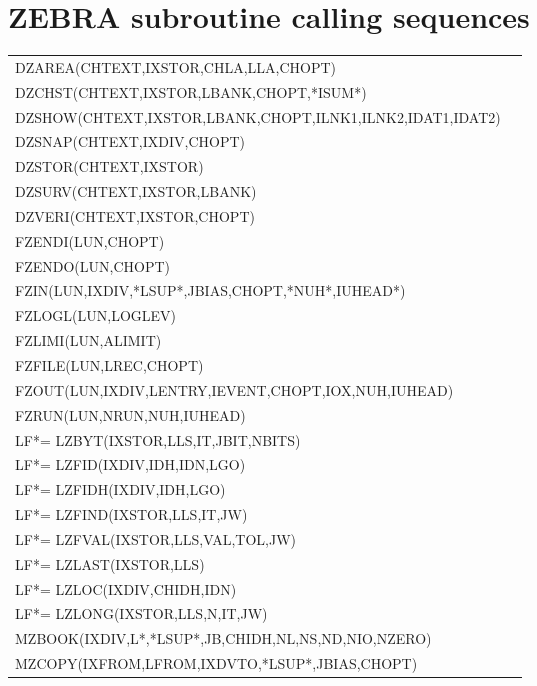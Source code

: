 \section{ZEBRA subroutine calling sequences}
{\tt \begin{tabular*}{\textwidth}{l@{\extracolsep{\fill}}r}
DZAREA(CHTEXT,IXSTOR,CHLA,LLA,CHOPT)&\pageref{SR_DZAREA}\\
DZCHST(CHTEXT,IXSTOR,LBANK,CHOPT,*ISUM*)&\pageref{SR_DZCHST}\\
DZSHOW(CHTEXT,IXSTOR,LBANK,CHOPT,ILNK1,ILNK2,IDAT1,IDAT2)&\pageref{SR_DZSHOW}\\
DZSNAP(CHTEXT,IXDIV,CHOPT)&\pageref{SR_DZSNAP}\\
DZSTOR(CHTEXT,IXSTOR)&\pageref{SR_DZSTOR}\\
DZSURV(CHTEXT,IXSTOR,LBANK)&\pageref{SR_DZSURV}\\
DZVERI(CHTEXT,IXSTOR,CHOPT)&\pageref{SR_DZVERI}\\[2mm]
FZENDI(LUN,CHOPT)&\pageref{SR_FZENDI}\\
FZENDO(LUN,CHOPT)&\pageref{SR_FZENDO}\\
FZIN(LUN,IXDIV,*LSUP*,JBIAS,CHOPT,*NUH*,IUHEAD*)&\pageref{SR_FZIN}\\
FZLOGL(LUN,LOGLEV)&\pageref{SR_FZLOGL}\\
FZLIMI(LUN,ALIMIT)&\pageref{SR_FZLIMI}\\
FZFILE(LUN,LREC,CHOPT)&\pageref{SR_FZFILE}\\
FZOUT(LUN,IXDIV,LENTRY,IEVENT,CHOPT,IOX,NUH,IUHEAD)&\pageref{SR_FZOUT}\\
FZRUN(LUN,NRUN,NUH,IUHEAD)&\pageref{SR_FZRUN}\\[2mm]
LF*= LZBYT(IXSTOR,LLS,IT,JBIT,NBITS)&\pageref{SR_LZBYT}\\
LF*= LZFID(IXDIV,IDH,IDN,LGO)&\pageref{SR_LZFID}\\
LF*= LZFIDH(IXDIV,IDH,LGO)&\pageref{SR_LZFIDH}\\
LF*= LZFIND(IXSTOR,LLS,IT,JW)&\pageref{SR_LZFIND}\\
LF*= LZFVAL(IXSTOR,LLS,VAL,TOL,JW)&\pageref{SR_LZFVAL}\\
LF*= LZLAST(IXSTOR,LLS)&\pageref{SR_LZLAST}\\
LF*= LZLOC(IXDIV,CHIDH,IDN)&\pageref{SR_LZLOC}\\
LF*= LZLONG(IXSTOR,LLS,N,IT,JW)&\pageref{SR_LZLONG}\\[2mm]
MZBOOK(IXDIV,L*,*LSUP*,JB,CHIDH,NL,NS,ND,NIO,NZERO)&\pageref{SR_MZBOOK}\\
MZCOPY(IXFROM,LFROM,IXDVTO,*LSUP*,JBIAS,CHOPT)&\pageref{SR_MZCOPY}\\

\end{tabular*}}
